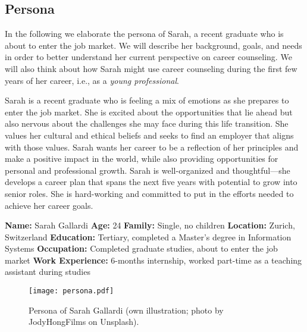 \subsection{Persona}

In the following we elaborate the persona of Sarah, a recent graduate who is about to enter the job market. We will
describe her background, goals, and needs in order to better understand her current perspective on career counseling.
We will also think about how Sarah might use career counseling during the first few years of her career, i.e., as
a \textit{young professional}.

Sarah is a recent graduate who is feeling a mix of emotions as she prepares to enter the job market.
She is excited about the opportunities that lie ahead but also nervous about the challenges she may face during this life transition.
She values her cultural and ethical beliefs and seeks to find an employer that aligns with those values. Sarah wants her career to be
a reflection of her principles and make a positive impact in the world, while also providing opportunities for personal and professional
growth. Sarah is well-organized and thoughtful---she develops a career plan that spans the next five years with potential to grow into
senior roles. She is hard-working and committed to put in the efforts needed to achieve her career goals.
\vspace*{0.2cm}

\noindent \textbf{Name:} Sarah Gallardi
\newline\noindent\textbf{Age:} 24
\newline\noindent\textbf{Family:} Single, no children
\newline\noindent\textbf{Location:} Zurich, Switzerland
\newline\noindent\textbf{Education:} Tertiary, completed a Master's degree in Information Systems
\newline\noindent\textbf{Occupation:} Completed graduate studies, about to enter the job market
\newline\noindent\textbf{Work Experience:} 6-months internship, worked part-time as a teaching assistant during studies

\begin{figure}[h!]
    \centering
    \caption{Persona of Sarah Gallardi (own illustration; photo by JodyHongFilms on Unsplash).}
    \label{fig:persona}
    \texttt{[image: persona.pdf]}
\end{figure}

